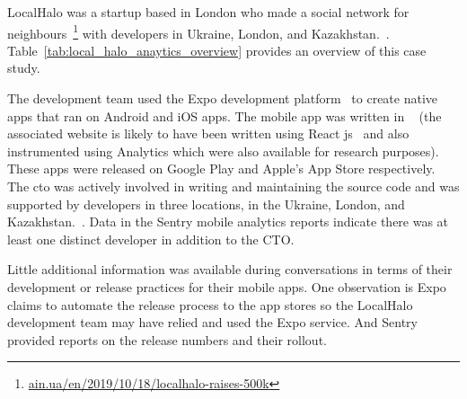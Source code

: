     
LocalHalo was a startup based in London who made a social network for neighbours~\footnote{\href{https://ain.ua/en/2019/10/18/localhalo-raises-500k/}{ain.ua/en/2019/10/18/localhalo-raises-500k}} with developers in Ukraine, London, and Kazakhstan.~. 
Table~\ref{tab:local_halo_anaytics_overview} provides an overview of this case study.

The development team used the Expo development platform~ to create native apps that ran on Android and iOS apps. The mobile app was written in ~ (the associated website is likely to have been written using React js~ and also instrumented using  Analytics which were also available for research purposes). These apps were released on Google Play and Apple's App Store respectively. The \acrshort{cto} was actively involved in writing and maintaining the source code and was supported by developers in three locations, in the Ukraine, London, and Kazakhstan.~.  Data in the Sentry mobile analytics reports indicate there was at least one distinct developer in addition to the CTO.

Little additional information was available during conversations in terms of their development or release practices for their mobile apps. One observation is Expo claims to automate the release process to the app stores so the LocalHalo development team may have relied and used the Expo service. And Sentry provided reports on the release numbers and their rollout.

